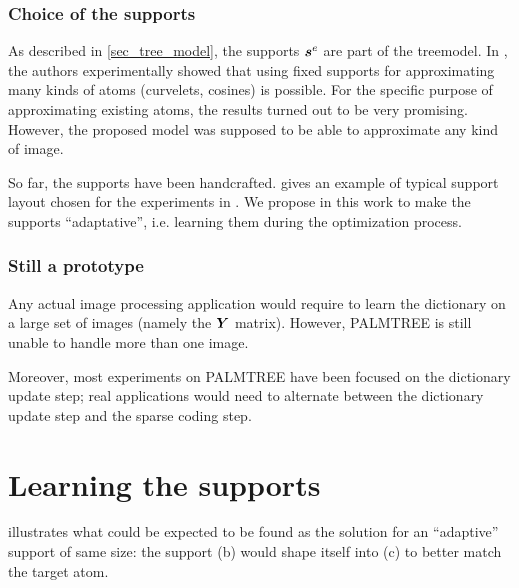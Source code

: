 \subsubsection{Choice of the supports}

As described in \cref{sec_tree_model}, the supports $\bm{s}^e$ are part of the \gls{treemodel}. In \cite{chabiron_toward_2015}, the authors experimentally showed that using fixed supports for approximating many kinds of atoms (curvelets, cosines) is possible. For the specific purpose of approximating existing atoms, the results turned out to be very promising. However, the proposed model was supposed to be able to approximate any kind of image.

So far, the supports have been handcrafted.  gives an example of typical support layout chosen for the experiments in \cite{chabiron_optimization_2016}. We propose in this work to make the supports “adaptative”, i.e. learning them during the optimization process.

\subsubsection{Still a prototype}
Any actual image processing application would require to learn the dictionary on a large set of images (namely the $\bm{Y}$ matrix). However, \ac{PALMTREE} is still unable to handle more than one image.

Moreover, most experiments on \ac{PALMTREE} have been focused on the dictionary update step; real applications would need to alternate between the dictionary update step and the sparse coding step.

\section{Learning the supports}

 illustrates what could be expected to be found as the solution for an “adaptive” support of same size: the support (b) would shape itself into (c) to better match the target atom.

